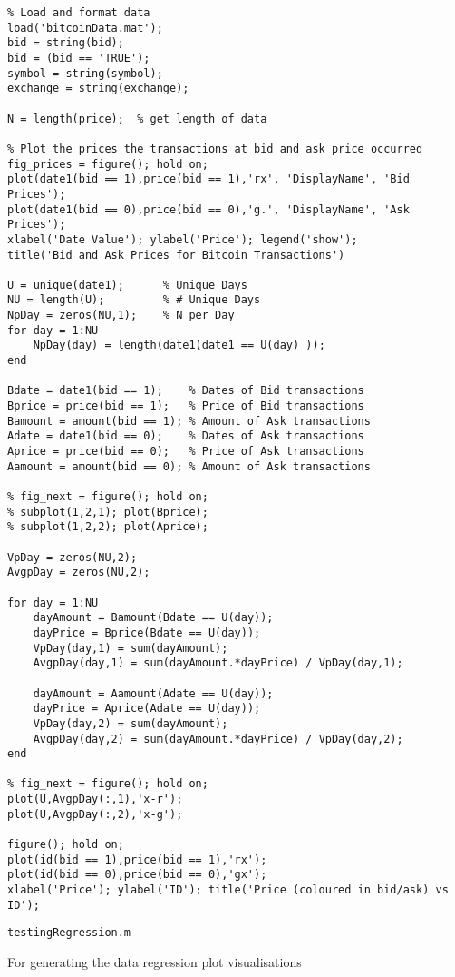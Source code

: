 \documentclass{article}
\begin{document}
\begin{lstlisting}
% Load and format data
load('bitcoinData.mat');
bid = string(bid);
bid = (bid == 'TRUE');
symbol = string(symbol);
exchange = string(exchange);

N = length(price);  % get length of data

% Plot the prices the transactions at bid and ask price occurred 
fig_prices = figure(); hold on;
plot(date1(bid == 1),price(bid == 1),'rx', 'DisplayName', 'Bid Prices');
plot(date1(bid == 0),price(bid == 0),'g.', 'DisplayName', 'Ask Prices');
xlabel('Date Value'); ylabel('Price'); legend('show');
title('Bid and Ask Prices for Bitcoin Transactions')

U = unique(date1);      % Unique Days
NU = length(U);         % # Unique Days
NpDay = zeros(NU,1);    % N per Day
for day = 1:NU
    NpDay(day) = length(date1(date1 == U(day) ));
end

Bdate = date1(bid == 1);    % Dates of Bid transactions
Bprice = price(bid == 1);   % Price of Bid transactions
Bamount = amount(bid == 1); % Amount of Ask transactions
Adate = date1(bid == 0);    % Dates of Ask transactions
Aprice = price(bid == 0);   % Price of Ask transactions
Aamount = amount(bid == 0); % Amount of Ask transactions

% fig_next = figure(); hold on;
% subplot(1,2,1); plot(Bprice);
% subplot(1,2,2); plot(Aprice);

VpDay = zeros(NU,2);
AvgpDay = zeros(NU,2);

for day = 1:NU
    dayAmount = Bamount(Bdate == U(day));
    dayPrice = Bprice(Bdate == U(day));
    VpDay(day,1) = sum(dayAmount);
    AvgpDay(day,1) = sum(dayAmount.*dayPrice) / VpDay(day,1);
    
    dayAmount = Aamount(Adate == U(day));
    dayPrice = Aprice(Adate == U(day));
    VpDay(day,2) = sum(dayAmount);
    AvgpDay(day,2) = sum(dayAmount.*dayPrice) / VpDay(day,2);
end

% fig_next = figure(); hold on;
plot(U,AvgpDay(:,1),'x-r');
plot(U,AvgpDay(:,2),'x-g');

figure(); hold on;
plot(id(bid == 1),price(bid == 1),'rx');
plot(id(bid == 0),price(bid == 0),'gx');
xlabel('Price'); ylabel('ID'); title('Price (coloured in bid/ask) vs ID');
\end{lstlisting}


\texttt{testingRegression.m}

For generating the data regression plot visualisations
\end{document}
